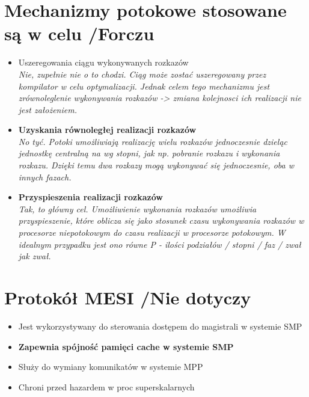 \documentclass[a4paper,twoside]{article}
\begin{document}
\section{Mechanizmy potokowe stosowane są w celu {\small /Forczu}}
	\begin{itemize}
    \item Uszeregowania ciągu wykonywanych rozkazów\\
    {\small \emph{Nie, zupełnie nie o to chodzi. Ciąg może zostać uszeregowany przez kompilator w celu optymalizacji. Jednak celem tego mechanizmu jest zrównoleglenie wykonywania rozkazów -> zmiana kolejnosci ich realizacji nie jest założeniem.}}
    \item \textbf{Uzyskania równoległej realizacji rozkazów}\\
    {\small \emph{No tyć. Potoki umożliwiają realizację wielu rozkazów jednoczesnie dzieląc jednostkę centralną na wg stopni, jak np. pobranie rozkazu i wykonania rozkazu. Dzięki temu dwa rozkazy mogą wykonywać się jednoczesnie, oba w innych fazach.}}
    \item \textbf{Przyspieszenia realizacji rozkazów}\\
    {\small \emph{Tak, to główny cel. Umożliwienie wykonania rozkazów umożliwia przyspieszenie, które oblicza się jako stosunek czasu wykonywania rozkazów w procesorze niepotokowym do czasu realizacji w procesorze potokowym. W idealnym przypadku jest ono równe \emph{P} - ilości podziałów / stopni / faz / zwał jak zwał.}}
    \end{itemize}

\section{Protokół MESI {\small /Nie dotyczy}}
	\begin{itemize}
    \item Jest wykorzystywany do sterowania dostępem do magistrali w systemie SMP
    \item \textbf{Zapewnia spójność pamięci cache w systemie SMP}
    \item Służy do wymiany komunikatów w systemie MPP
    \item Chroni przed hazardem w proc superskalarnych
    \end{itemize}
    
\end{document}
